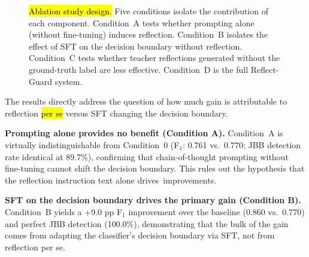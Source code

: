 \documentclass[superintelligence,article,accept,moreauthors]{Definitions/mdpi}
\begin{document}
\begin{figure}[H]
{}%
\caption{\hl{Ablation study design.}
Five conditions isolate the contribution of each component.
Condition~A tests whether prompting alone (without fine-tuning) induces reflection.
Condition~B isolates the effect of SFT on the decision boundary without reflection.
Condition~C tests whether teacher reflections generated without the ground-truth label are less effective.
Condition~D is the full Reflect-Guard system.\label{fig:ablation}}
\end{figure}






\vspace{-6pt}



\vspace{-5pt}

The results directly address the question of how much gain is attributable to reflection \hl{per se}
 versus SFT changing the decision boundary.

\textbf{Prompting alone provides no benefit (Condition A).}
Condition~A is virtually indistinguishable from Condition~0 (F$_1$: 0.761 vs.\ 0.770; JBB detection rate identical at 89.7\%), confirming that chain-of-thought prompting without fine-tuning cannot shift the decision boundary. This rules out the hypothesis that the reflection instruction text alone \mbox{drives improvements.}

\textbf{SFT on the decision boundary drives the primary gain (Condition B).}
Condition~B yields a +9.0 pp F$_1$ improvement over the baseline (0.860 vs.\ 0.770) and perfect JBB detection (100.0\%), demonstrating that the bulk of the gain comes from adapting the classifier's decision boundary via SFT, not from reflection per se.
\end{document}
